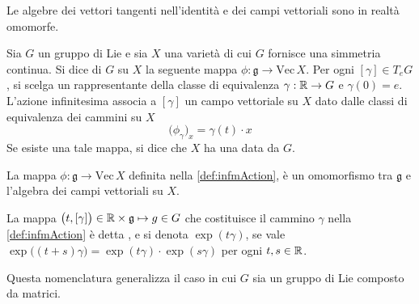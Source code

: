 Le algebre dei vettori tangenti nell'identità e dei campi vettoriali sono in realtà omomorfe.
\begin{definition} \label{def:infmAction}
  Sia $G$ un gruppo di Lie e sia $X$ una varietà di cui $G$ fornisce una simmetria continua. Si dice  di $G$ su $X$ la seguente mappa $\phi: \mathfrak{g} \to \mathrm{Vec}\, X$. Per ogni $[\gamma] \in T_e G$, si scelga un rappresentante della classe di equivalenza $\gamma:\mathbb{R}\to G$ e $\gamma(0) = e$. L'azione infinitesima associa a $[\gamma]$ un campo vettoriale su $X$ dato dalle classi di equivalenza dei cammini su $X$
  \begin{equation*}
  \big(\phi_{\gamma}\big)_x = \gamma(t) \cdot x
  \end{equation*}
  Se esiste una tale mappa, si dice che $X$ ha una  data da $G$.
\end{definition}
\begin{theorem}
  La mappa $\phi: \mathfrak{g} \to \mathrm{Vec}\, X$ definita nella \autoref{def:infmAction}, è un omomorfismo tra $\mathfrak{g}$ e l'algebra dei campi vettoriali su $X$.
\end{theorem}
\begin{definition}
  La mappa $\big(t, [\gamma]\big) \in \mathbb{R} \times  \mathfrak{g} \mapsto g \in G$ che costituisce il cammino $\gamma$ nella \autoref{def:infmAction} è detta , e si denota $\exp(t \gamma)$, se vale $\exp\big((t+s) \gamma\big) = \exp(t \gamma) \cdot  \exp (s \gamma)$ per ogni $t,s \in \mathbb{R}$.
\end{definition}
\begin{remark}
  Questa nomenclatura generalizza il caso in cui $G$ sia un gruppo di Lie composto da matrici.
\end{remark}

